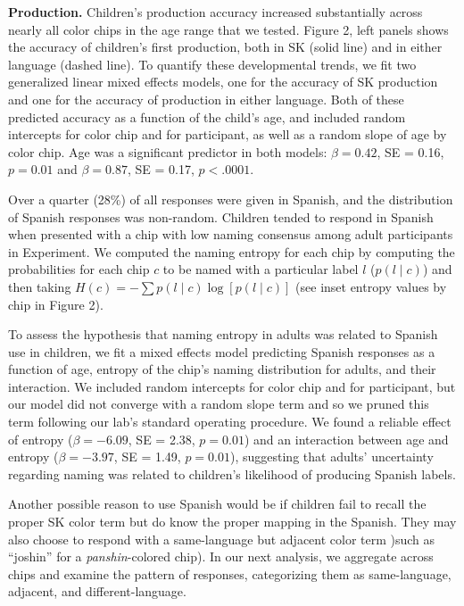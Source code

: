 \documentclass[floatsintext,man]{apa6}
\theoremstyle{definition}
\theoremstyle{definition}
\theoremstyle{definition}
\theoremstyle{remark}
\begin{document}
\textbf{Production.} Children's production accuracy increased
substantially across nearly all color chips in the age range that we
tested. Figure 2, left panels shows the accuracy of children's first
production, both in SK (solid line) and in either language (dashed
line). To quantify these developmental trends, we fit two generalized
linear mixed effects models, one for the accuracy of SK production and
one for the accuracy of production in either language. Both of these
predicted accuracy as a function of the child's age, and included random
intercepts for color chip and for participant, as well as a random slope
of age by color chip. Age was a significant predictor in both models:
\(\beta = 0.42\), SE = 0.16, \(p = 0.01\) and \(\beta = 0.87\), SE =
0.17, \(p < .0001\).

Over a quarter (28\%) of all responses were given in Spanish, and the
distribution of Spanish responses was non-random. Children tended to
respond in Spanish when presented with a chip with low naming consensus
among adult participants in Experiment. We computed the naming entropy
for each chip by computing the probabilities for each chip \(c\) to be
named with a particular label \(l\) (\(p(l \mid c)\)) and then taking
\(H(c) = - \sum{p(l\mid c) \log[p(l \mid c)]}\) (see inset entropy
values by chip in Figure 2).

To assess the hypothesis that naming entropy in adults was related to
Spanish use in children, we fit a mixed effects model predicting Spanish
responses as a function of age, entropy of the chip's naming
distribution for adults, and their interaction. We included random
intercepts for color chip and for participant, but our model did not
converge with a random slope term and so we pruned this term following
our lab's standard operating procedure. We found a reliable effect of
entropy (\(\beta = -6.09\), SE = 2.38, \(p = 0.01\)) and an interaction
between age and entropy (\(\beta = -3.97\), SE = 1.49, \(p = 0.01\)),
suggesting that adults' uncertainty regarding naming was related to
children's likelihood of producing Spanish labels.

Another possible reason to use Spanish would be if children fail to
recall the proper SK color term but do know the proper mapping in the
Spanish. They may also choose to respond with a same-language but
adjacent color term )such as \enquote{joshin} for a
\emph{panshin}-colored chip). In our next analysis, we aggregate across
chips and examine the pattern of responses, categorizing them as
same-language, adjacent, and different-language.
\end{document}
